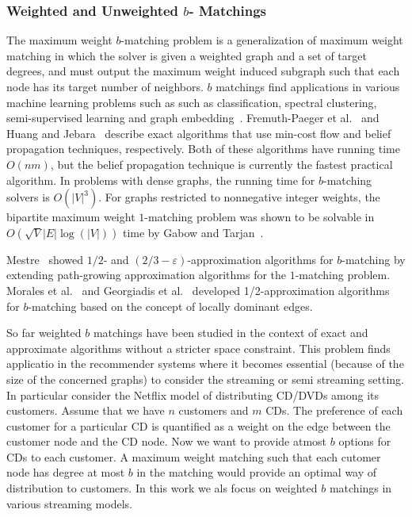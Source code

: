 \subsubsection{Weighted and Unweighted $b$- Matchings}
The maximum weight $b$-matching problem is a
generalization of maximum weight matching in which
the solver is given a weighted graph and a set of target
degrees, and must output the maximum weight
induced subgraph such that each node has its target
number of neighbors. $b$ matchings find applications in various machine learning problems such as such as classification, spectral clustering, semi-supervised learning and graph embedding~\cite{JH}.
 Fremuth-Paeger et al.~\cite{FPCJD}  and Huang and Jebara~\cite{JH} describe exact algorithms that use min-cost flow and belief propagation techniques, respectively. Both of these algorithms have running time $O(nm)$, but the belief propagation technique is currently the fastest practical algorithm.
In problems with dense
graphs, the running time for $b$-matching solvers is $O(|V|^3)$. For graphs restricted to nonnegative integer weights,
the bipartite maximum weight $1$-matching problem
was shown to be solvable in $O(\sqrt{V}|E| \log(|V |))$ time
by Gabow and Tarjan~\cite{GabowTarjan}.

Mestre~\cite{Mestre}  showed $1/2$- and $(2/3 - \varepsilon)$-approximation algorithms for $b$-matching by extending path-growing approximation algorithms for the $1$-matching problem. Morales et al.~\cite{DeFrancisciMorales} and Georgiadis et al.~\cite{GeorgiadisP13} developed 1/2-approximation algorithms for $b$-matching based on the concept of locally dominant edges.

So far weighted $b$ matchings have been studied in the context of exact and approximate algorithms without a stricter space constraint. This problem finds applicatio in the recommender systems where it becomes essential (because of the size of the concerned graphs) to consider the streaming or semi streaming setting. In particular consider the Netflix model of distributing CD/DVDs among its customers. Assume that we have $n$ customers and $m$ CDs. The preference of each customer for a particular CD is quantified as a weight on the edge between the customer node and the CD node. Now we want to provide atmost $b$ options for CDs to each customer. A maximum weight matching such that each cutomer node has degree at most $b$ in the matching would provide an optimal way of distribution to customers. In this work we als focus on weighted $b$ matchings in various streaming models.

